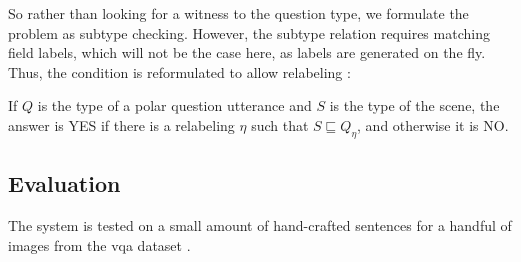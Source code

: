 So rather than looking for a witness to the question type, we formulate the problem as subtype checking.
However, the subtype relation requires matching field labels, which will not be the case here, as labels are generated on the fly.
Thus, the condition is reformulated to allow relabeling \citep[pp. 133–135]{CooperTypetheorylanguage2016}:

If $Q$ is the type of a polar question utterance and $S$ is the type of the scene, the answer is YES if there is a relabeling $\eta$ such that $S \sqsubseteq Q_\eta$, and otherwise it is NO.




\subsection{Evaluation}

The system is tested on a small amount of hand-crafted sentences for a handful of images from the \gls{vqa} dataset \citep{AgrawalVQAVisualQuestion2015}.

